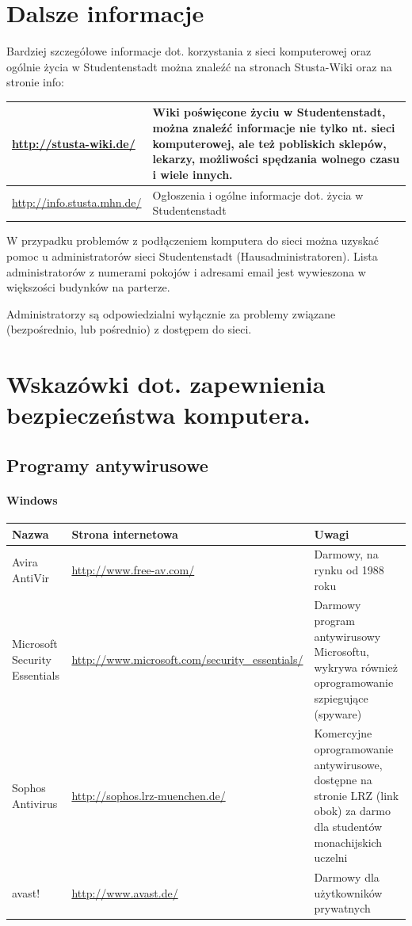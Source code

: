 \documentclass[a4paper,12pt]{scrartcl}
\begin{document}
\section*{Dalsze informacje}

Bardziej szczegółowe informacje dot. korzystania z sieci komputerowej oraz ogólnie życia w Studentenstadt można znaleźć na stronach Stusta-Wiki oraz na stronie info:

\begin{center}
  \begin{tabularx}{\linewidth}{|lX|}
    \hline
    \url{http://stusta-wiki.de/} & Wiki poświęcone życiu w Studentenstadt, można znaleźć informacje nie tylko nt. sieci komputerowej, ale też pobliskich sklepów, lekarzy, możliwości spędzania wolnego czasu i wiele innych.\\
    \hline
    \url{http://info.stusta.mhn.de/} & Ogłoszenia i ogólne informacje dot. życia w Studentenstadt\\
    \hline
  \end{tabularx}
\end{center}
W przypadku problemów z podłączeniem komputera do sieci można uzyskać pomoc u administratorów sieci Studentenstadt (Hausadministratoren). Lista administratorów z numerami pokojów i adresami email jest wywieszona w większości budynków na parterze. 

Administratorzy są odpowiedzialni wyłącznie za problemy związane (bezpośrednio, lub pośrednio) z dostępem do sieci.

\newpage
\enlargethispage{20pt}
\section*{Wskazówki dot. zapewnienia bezpieczeństwa komputera.}

\subsection*{Programy antywirusowe}
\paragraph*{Windows}
\begin{center}
  \begin{tabularx}{\linewidth}{|p{.2\linewidth}XX|}
    \hline
    Nazwa & Strona internetowa & Uwagi\\
    \hline \hline
    Avira AntiVir & \url{http://www.free-av.com/} & Darmowy, na rynku od 1988 roku\\
    \hline
    Microsoft Security Essentials & \url{http://www.microsoft.com/security\_essentials/} & Darmowy program antywirusowy Microsoftu, wykrywa również oprogramowanie szpiegujące (spyware)\\
    \hline
    Sophos Antivirus & \url{http://sophos.lrz-muenchen.de/} & Komercyjne oprogramowanie antywirusowe, dostępne na stronie LRZ (link obok) za darmo dla studentów monachijskich uczelni\\
    \hline
    avast! & \url{http://www.avast.de/} & Darmowy dla użytkowników prywatnych\\
    \hline
  \end{tabularx}
\end{center}
\end{document}
